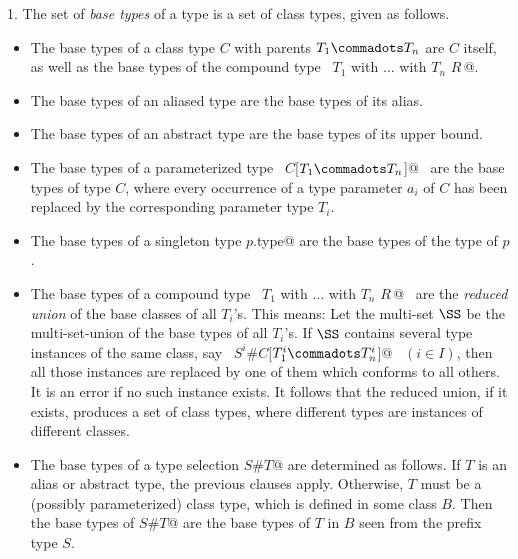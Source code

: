 1. The set of {\em base types} of a type is a set of class types, 
given as follows.
\begin{itemize}
\item
The base types of a class type $C$ with parents $T_1 \commadots T_n$ are
$C$ itself, as well as the base types of the compound type
~\lstinline@$T_1$ with $\ldots$ with $T_n$ {$R\,$}@.
\item
The base types of an aliased type are the base types of its alias.
\item
The base types of an abstract type are the base types of its upper bound.
\item
The base types of a parameterized type 
~\lstinline@$C$[$T_1 \commadots T_n$]@~ are the base types
of type $C$, where every occurrence of a type parameter $a_i$ 
of $C$ has been replaced by the corresponding parameter type $T_i$.
\item
The base types of a singleton type \lstinline@$p$.type@ are the base types of
the type of $p$.
\item
The base types of a compound type 
~\lstinline@$T_1$ with $\ldots$ with $T_n$ {$R\,$}@~ 
are the {\em reduced union} of the base
classes of all $T_i$'s. This means: 
Let the multi-set $\SS$ be the multi-set-union of the
base types of all $T_i$'s.
If $\SS$ contains several type instances of the same class, say
~\lstinline@$S^i$#$C$[$T^i_1 \commadots T^i_n$]@~ $(i \in I)$, then
all those instances 
are replaced by one of them which conforms to all
others. It is an error if no such instance exists. It follows that the reduced union, if it exists,
produces a set of class types, where different types are instances of different classes.
\item
The base types of a type selection \lstinline@$S$#$T$@ are
determined as follows. If $T$ is an alias or abstract type, the
previous clauses apply. Otherwise, $T$ must be a (possibly
parameterized) class type, which is defined in some class $B$.  Then
the base types of \lstinline@$S$#$T$@ are the base types of $T$
in $B$ seen from the prefix type $S$.
\end{itemize}

